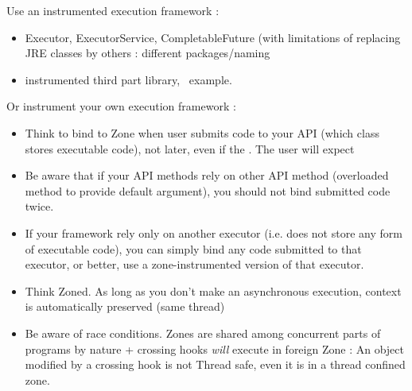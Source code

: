 Use an instrumented execution framework :
\begin{itemize}
\item Executor, ExecutorService, CompletableFuture (with limitations of replacing JRE classes by others : different packages/naming
\item instrumented third part library, \vertx\ example.
\end{itemize}

Or instrument your own execution framework :
\begin{itemize}
\item Think to bind to Zone when user submits code to your API (which class stores executable code), not later, even if the . The user will expect
\item Be aware that if your API methods rely on other API method (overloaded method to provide default argument), you should not bind submitted code twice.
\item If your framework rely only on another executor (i.e. does not store any form of executable code), you can simply bind any code submitted to that executor, or better, use a zone-instrumented version of that executor.
\item Think Zoned. As long as you don't make an asynchronous execution, context is automatically preserved (same thread)
\item Be aware of race conditions. Zones are shared among concurrent parts of programs by nature + crossing hooks \emph{will} execute in foreign Zone : An object modified by a crossing hook is not Thread safe, even it is in a thread confined zone.
\end{itemize}